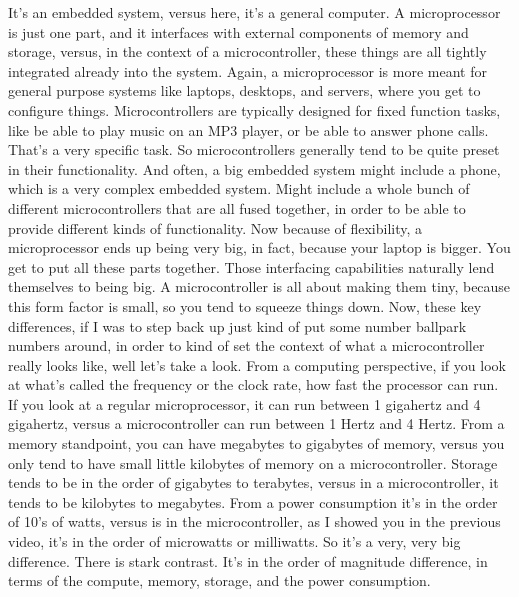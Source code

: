 It's an embedded system, versus here, it's a general computer.
A microprocessor is just one part, and it interfaces with external components of memory and storage, versus, in the context of a microcontroller, these things are all tightly integrated already into the system.
Again, a microprocessor is more meant for general purpose systems like laptops, desktops, and servers, where you get to configure things.
Microcontrollers are typically designed for fixed function tasks, like be able to play music on an MP3 player, or be able to answer phone calls.
That's a very specific task.
So microcontrollers generally tend to be quite preset in their functionality.
And often, a big embedded system might include a phone, which is a very complex embedded system.
Might include a whole bunch of different microcontrollers that are all fused together, in order to be able to provide different kinds of functionality.
Now because of flexibility, a microprocessor ends up being very big, in fact, because your laptop is bigger.
You get to put all these parts together.
Those interfacing capabilities naturally lend themselves to being big.
A microcontroller is all about making them tiny, because this form factor is small, so you tend to squeeze things down.
Now, these key differences, if I was to step back up just kind of put some number ballpark numbers around, in order to kind of set the context of what a microcontroller really looks like, well let's take a look.
From a computing perspective, if you look at what's called the frequency or the clock rate, how fast the processor can run.
If you look at a regular microprocessor, it can run between 1 gigahertz and 4 gigahertz, versus a microcontroller can run between 1 Hertz and 4 Hertz.
From a memory standpoint, you can have megabytes to gigabytes of memory, versus you only tend to have small little kilobytes of memory on a microcontroller.
Storage tends to be in the order of gigabytes to terabytes, versus in a microcontroller, it tends to be kilobytes to megabytes.
From a power consumption it's in the order of 10's of watts, versus is in the microcontroller, as I showed you in the previous video, it's in the order of microwatts or milliwatts.
So it's a very, very big difference.
There is stark contrast.
It's in the order of magnitude difference, in terms of the compute, memory, storage, and the power consumption.




